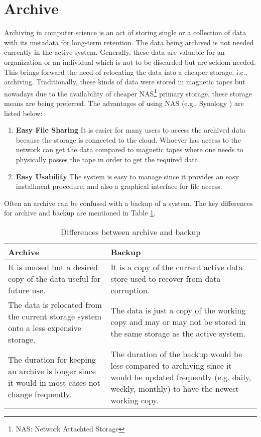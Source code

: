 \section{Archive}
Archiving in computer science is an act of storing single or a collection of data with its metadata for long-term retention. The data being archived is 
not needed currently in the active system. Generally, these data are valuable for an organization or an individual which is not to be discarded but are seldom needed. 
This brings forward the need of relocating the data into a cheaper storage, i.e., archiving. Traditionally, these kinds of data were stored in magnetic tapes but nowadays 
due to the availability of cheaper NAS\footnote{NAS: Network Attachted Storage} primary storage, 
these storage means are being preferred. 
The advantages of using NAS (e.g., Synology \cite{Synology}) are listed below:
\begin{enumerate}
    \item \textbf{Easy File Sharing} It is easier for many users to access the archived data because the storage is connected to the cloud. Whoever has access to the
    network can get the data compared to magnetic tapes where one needs to physically posses the tape in order to get the required data.
    \item \textbf{Easy Usability} The system is easy to manage since it provides an easy installment procedure, and also a graphical interface for file access.
\end{enumerate}
Often an archive can be confused
with a backup of a system. The key differences for archive and backup are mentioned in Table \ref{table:archiveVsBackup}.

\begin{table}[H]
    \centering
    \begin{tabular}{|p{7cm}|p{7cm}|}
        \hline
            \textbf{Archive}  & \textbf{Backup}\\
        \hline
            It is unused but a desired copy of the data useful for future use.& 
            It is a copy of the current active data store used to recover from data corruption. \\
        \hline
            The data is relocated from the current storage system onto a less expensive storage.
            & The data is just a copy of the working copy and may or may not be stored in the same storage as the active system.\\
        \hline
             The duration for keeping an archive is longer since it would in most cases not change frequently.
             & The duration of the backup would be less compared to archiving since it would be updated frequently (e.g. daily, weekly, monthly) to have the newest 
             working copy.\\
        \hline
    \end{tabular}
    \caption{Differences between archive and backup}
    \label{table:archiveVsBackup}     
\end{table}    